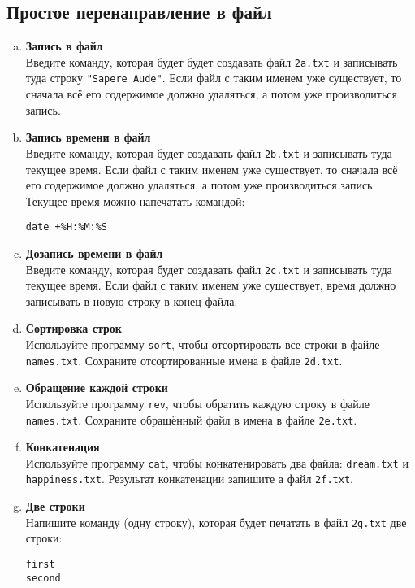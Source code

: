 \documentclass{article}
\begin{document}
\subsection{Простое перенаправление в файл}
\begin{enumerate}[a.]
\item \textbf{Запись в файл}\\
Введите команду, которая будет будет создавать файл \texttt{2a.txt} и записывать туда строку \texttt{"Sapere Aude"}. Если файл с таким именем уже существует, то сначала всё его содержимое должно удаляться, а потом уже производиться запись.

\item \textbf{Запись времени в файл}\\
Введите команду, которая будет создавать файл \texttt{2b.txt} и записывать туда текущее время. Если файл с таким именем уже существует, то сначала всё его содержимое должно удаляться, а потом уже производиться запись. Текущее время можно напечатать командой:
\begin{lstlisting}
date +%H:%M:%S
\end{lstlisting}

\item \textbf{Дозапись времени в файл}\\
Введите команду, которая будет создавать файл \texttt{2c.txt} и записывать туда текущее время. Если файл с таким именем уже существует, время должно записывать в новую строку в конец файла.

\item \textbf{Сортировка строк}\\
Используйте программу \texttt{sort}, чтобы отсортировать все строки в файле \texttt{names.txt}. Сохраните отсортированные имена в файле \texttt{2d.txt}.

\item \textbf{Обращение каждой строки}\\
Используйте программу \texttt{rev}, чтобы обратить каждую строку в файле \texttt{names.txt}. Сохраните обращённый файл в имена в файле \texttt{2e.txt}.

\item \textbf{Конкатенация}\\
Используйте программу \texttt{cat}, чтобы конкатенировать два файла: \texttt{dream.txt} и \texttt{happiness.txt}. Результат конкатенации запишите а файл \texttt{2f.txt}.

\item \textbf{Две строки}\\
Напишите команду (одну строку), которая будет печатать в файл \texttt{2g.txt} две строки:
\begin{lstlisting}
first
second
\end{lstlisting}
\end{enumerate}
\end{document}
